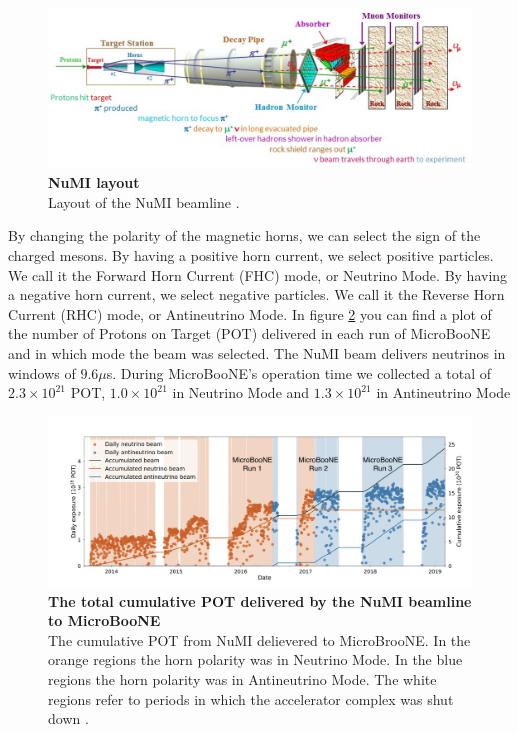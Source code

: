 \begin{figure}[h!]
    \centering
    \includegraphics[width=140mm]{Figures/numi.jpg}
    \caption[NuMI layout]{{\textbf{NuMI layout}} \\Layout of the NuMI beamline \cite{numi}.}
    \label{fig:numi}
\end{figure}
  
By changing the polarity of the magnetic horns, we can select the sign of the charged mesons. By having a positive horn current, we select positive particles. We call it the Forward Horn Current (FHC) mode, or Neutrino Mode. By having a negative horn current, we select negative particles. We call it the Reverse Horn Current (RHC) mode, or Antineutrino Mode. In figure \ref{beam_mode_uboone} you can find a plot of the number of Protons on Target (POT) delivered in each run of MicroBooNE and in which mode the beam was selected. The NuMI beam delivers neutrinos in windows of $9.6 \mu$s. During MicroBooNE's operation time we collected a total of $2.3\times 10^{21}$ POT, $1.0\times10^{21}$ in Neutrino Mode and $1.3\times10^{21}$ in Antineutrino Mode
 
\begin{figure}[h!]
    \centering
    \includegraphics[width=150mm]{Figures/beam_mode_uboone.png}
    \caption[The total cumulative POT delivered by the NuMI beamline to MicroBooNE]{{\textbf{The total cumulative POT delivered by the NuMI beamline to MicroBooNE}}\\The cumulative POT from NuMI delievered to MicroBrooNE. In the orange regions the horn polarity was in Neutrino Mode. In the blue regions the horn polarity was in Antineutrino Mode. The white regions refer to periods in which the accelerator complex was shut down \cite{krish_phd}.}
    \label{beam_mode_uboone}
\end{figure}
  
